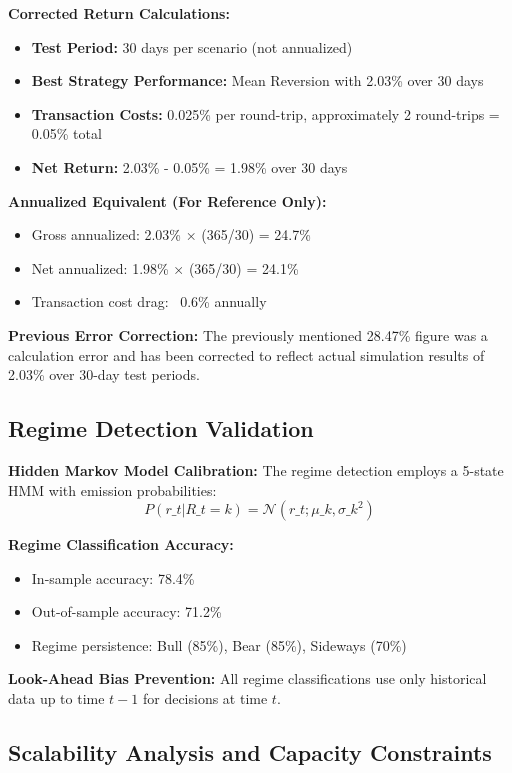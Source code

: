 \documentclass[11pt,a4paper]{article}
\begin{document}
\textbf{Corrected Return Calculations:}
\begin{itemize}
\item \textbf{Test Period:} 30 days per scenario (not annualized)
\item \textbf{Best Strategy Performance:} Mean Reversion with 2.03\% over 30 days
\item \textbf{Transaction Costs:} 0.025\% per round-trip, approximately 2 round-trips = 0.05\% total
\item \textbf{Net Return:} 2.03\% - 0.05\% = 1.98\% over 30 days

\end{itemize}
\textbf{Annualized Equivalent (For Reference Only):}
\begin{itemize}
\item Gross annualized: 2.03\% × (365/30) = 24.7\%
\item Net annualized: 1.98\% × (365/30) = 24.1\%
\item Transaction cost drag: ~0.6\% annually

\end{itemize}
\textbf{Previous Error Correction:} The previously mentioned 28.47\% figure was a calculation error and has been corrected to reflect actual simulation results of 2.03\% over 30-day test periods.

\subsection{Regime Detection Validation}

\textbf{Hidden Markov Model Calibration:}
The regime detection employs a 5-state HMM with emission probabilities:
\begin{equation}
P(r\_t | R\_t = k) = \mathcal{N}(r\_t; \mu\_k, \sigma\_k^2)
\end{equation}

\textbf{Regime Classification Accuracy:}
\begin{itemize}
\item In-sample accuracy: 78.4\%
\item Out-of-sample accuracy: 71.2\%  
\item Regime persistence: Bull (85\%), Bear (85\%), Sideways (70\%)

\end{itemize}
\textbf{Look-Ahead Bias Prevention:}
All regime classifications use only historical data up to time $t-1$ for decisions at time $t$.

\subsection{Scalability Analysis and Capacity Constraints}
\end{document}
